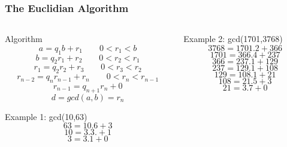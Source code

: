 \documentclass[usenames,dvipsnames]{beamer}
\begin{document}
\begin{frame}
  \frametitle{The Euclidian Algorithm}
  \footnotesize
  \begin{columns}[T]
  \begin{column}{0.5\linewidth}
  \begin{exampleblock}{Algorithm}
   \[ a=q_1b+r_1 \quad\quad 0<r_1<b \]
   \[ b=q_2r_1+r_2 \quad\quad 0<r_2<r_1 \]
   \[ r_1=q_2r_2+r_3 \quad\quad 0<r_3<r_2 \]
   \[ r_{n-2}=q_nr_{n-1}+r_n \quad\quad 0<r_n<r_{n-1} \]
    \[ r_{n-1}=q_{n+1}r_n+0 \]
    \[ d=gcd(a,b)=r_n\]
  \end{exampleblock}
    \begin{exampleblock}{Example 1: gcd(10,63)}
     \[63=10.6+3\]
     \[10=3.3.+1\]
     \[3=3.1+0\]
    \end{exampleblock}
  \end{column}
 \begin{column}{0.45\linewidth}
    \begin{exampleblock}{Example 2: gcd(1701,3768)}
     \[3768=1701.2+366\]
     \[1701=366.4+237\]
     \[366=237.1+129\]
     \[237=129.1+108\]
     \[129=108.1+21\]
     \[108=21.5+3\]
     \[21=3.7+0\]
    \end{exampleblock}
    \end{column}
\end{columns}
\end{frame}
\end{document}
